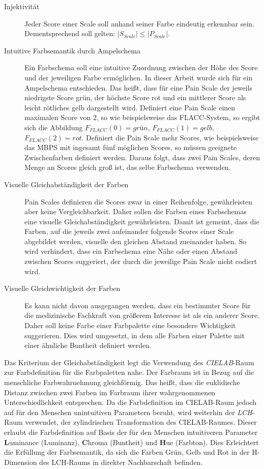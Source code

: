 \begin{description}
\item[Injektivität] Jeder Score einer Scale soll anhand seiner Farbe eindeutig erkennbar sein. Dementsprechend soll gelten: $|S_{Scale}| \leq |P_{Scale}|$.
\item[Intuitive Farbsemantik durch Ampelschema] Ein Farbschema soll eine intuitive Zuordnung zwischen der Höhe des Score und der jeweiligen Farbe ermöglichen. In dieser Arbeit wurde sich für ein Ampelschema entschieden. Das heißt, dass für eine Pain Scale der jeweils niedrigste Score \glqq grün\grqq{}, der höchste Score \glqq rot\grqq{} und ein \glqq mittlerer\grqq{} Score als \glqq leicht rötliches gelb\grqq{} dargestellt wird. Definiert eine Pain Scale einen maximalen Score von 2, so wie beispielsweise das FLACC-System, so ergibt sich die Abbildung $F_{FLACC}(0) =  grün$, $F_{FLACC}(1) = gelb$, $F_{FLACC}(2) = rot$. Definiert die Pain Scale mehr Scores, wie beispielsweise das MBPS mit ingesamt fünf möglichen Scores, so müssen geeignete Zwischenfarben definiert werden. Daraus folgt, dass zwei Pain Scales, deren Menge an Scores gleich groß ist, das selbe Farbschema verwenden.
\item[Visuelle Gleichabständigkeit der Farben] Pain Scales definieren die Scores zwar in einer Reihenfolge, gewährleisten aber keine Vergleichbarkeit. Daher sollen die Farben eines Farbschemas eine \glqq visuelle Gleichabständigkeit\grqq{} gewährleisten. Damit ist gemeint, dass die Farben, auf die jeweils zwei aufeinander folgende Scores einer Scale abgebildet werden, visuelle den gleichen Abstand zueinander haben. So wird verhindert, dass ein Farbschema eine Nähe oder einen Abstand zwischen Scores suggeriert, der durch die jeweilige Pain Scale nicht codiert wird. 
\item[Visuelle Gleichwichtigkeit der Farben] Es kann nicht davon ausgegangen werden, dass ein bestimmter Score für die medizinische Fachkraft von größerem Interesse ist als ein anderer Score. Daher soll keine Farbe einer Farbpalette eine besondere Wichtigkeit suggerieren. Dies wird umgesetzt, in dem alle Farben einer Palette mit einer ähnliche Buntheit definiert werden.\cite{bigman}
\end{description}

Das Kriterium der Gleichabständigkeit legt die Verwendung des \emph{CIELAB}-Raum zur Farbdefinition für die Farbpaletten nahe. Der Farbraum ist in Bezug auf die menschliche Farbwahrnehmung \glqq gleichförmig\grqq. Das heißt, dass die euklidische Distanz zwischen zwei Farben im Farbraum ihrer wahrgenommenen Unterschiedlichkeit entsprechen. Da die Farbdefinition im CIELAB-Raum jedoch auf für den Menschen unintuitiven Parametern beruht, wird weiterhin der \emph{LCH}-Raum verwendet, der zylindrischen Transformation des CIELAB-Raumes. Dieser erlaubt die Farbdefinition auf Basis der für den Menschen intuitiveren Parameter \textbf{L}uminance (Luminanz), \textbf{C}hroma (Buntheit) und \textbf{H}ue (Farbton). Dies Erleichtert die Erfüllung der Farbsemantik, da sich die Farben Grün, Gelb und Rot in der H-Dimension des LCH-Raums in direkter Nachbarschaft befinden.\cite{palettes}\cite{johnstone}

